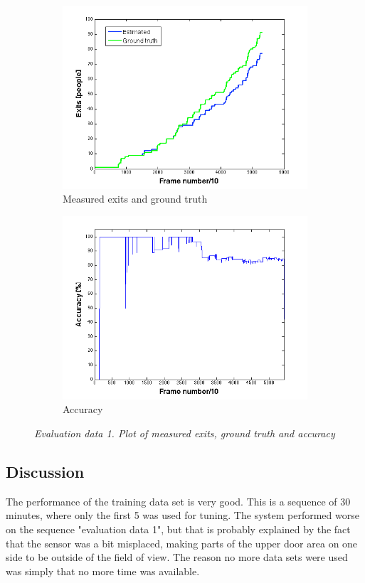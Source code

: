 \begin{figure}[H]
\centering
\begin{subfigure}{.5\textwidth}
  \centering
  \includegraphics[width=1.1\linewidth]{images/ExitsEval.png}
  \caption{Measured exits and ground truth}
  \label{fig:sub1}
\end{subfigure}%
\begin{subfigure}{.5\textwidth}
  \centering
  \includegraphics[width=1.1\linewidth]{images/AccExitsEval.png}
  \caption{Accuracy}
  \label{fig:sub2}
\end{subfigure}
\caption[Entries evaluation]{\textit{Evaluation data 1. Plot of measured exits, ground truth and accuracy}}
\label{fig:Exits evaluation}
\end{figure}

\subsection{Discussion}
The performance of the training data set is very good. This is a sequence of 30 minutes, where only the first 5 was used for tuning. The system performed worse on the sequence "evaluation data 1", but that is probably explained by the fact that the sensor was a bit misplaced, making parts of the upper door area on one side to be outside of the field of view. The reason no more data sets were used was simply that no more time was available.


